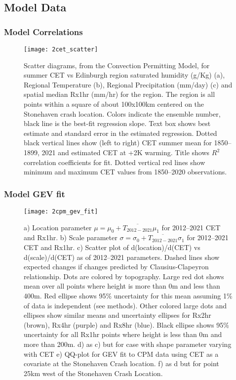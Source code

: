 \subsection{Model Data}\label{subsec:modelcorr}

\subsubsection{Model Correlations}

\begin{figure}[H]
    \centering
    \texttt{[image: 2cet\_scatter]}
    \caption{Scatter diagrams, from the Convection Permitting Model,
        for summer CET vs Edinburgh region saturated humidity (g/Kg) (a),
        Regional Temperature (b),
        Regional  Precipitation (mm/day) (c) and
        spatial median Rx1hr (mm/hr) for the region.
    The region is all points within a square of about 100x100km centered on the Stonehaven crash location.
    Colors indicate the ensemble number, black line is the best-fit regression slope.
    Text box shows best estimate and standard error in the estimated regression.
    Dotted black vertical lines show (left to right) CET summer mean for 1850--1899, 2021 and estimated CET at +2K warming.
    Title shows $R^2$ correlation coefficients for fit.
    Dotted vertical red lines show minimum and maximum CET values from 1850--2020 observations.}
    \label{fig:2cet_scatter}
\end{figure}

\subsubsection{Model GEV fit}

\begin{figure}[H]
    \centering
    \texttt{[image: 2cpm\_gev\_fit]}
    \caption{a) Location parameter $\mu = \mu_0 + \overline{T_{2012-2021}}\mu_1$  for 2012--2021 CET and Rx1hr.
    b) Scale parameter $\sigma = \sigma_0 + \overline{T_{2012-2021}}\sigma_1$ for 2012--2021 CET and Rx1hr.
    c) Scatter plot of d(location)/d(CET) vs d(scale)/d(CET) as of 2012--2021 parameters.
    Dashed lines show expected changes if changes predicted by Clausius-Clapeyron relationship.
    Dots are colored by topography.
    Large red dot shows mean over all points where height is more than 0m and less than 400m.
    Red ellipse shows 95\% uncertainty for this mean assuming 1\% of data is independent (see methods).
    Other colored large dots and ellipses show similar means and uncertainty ellipses for Rx2hr (brown), Rx4hr (purple) and Rx8hr (blue).
    Black ellipse shows 95\% uncertainty for all Rx1hr points where height is less than 0m and more than 200m.
    d) as c) but for case with shape parameter varying with CET
    e) QQ-plot for GEV fit to CPM data using CET as a covariate at the Stonehaven Crash location.
    f) as d but for point 25km west of the Stonehaven Crash Location.}
    \label{fig:2cpm_gev_fit}
\end{figure}


